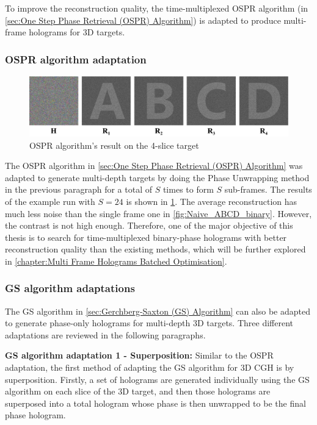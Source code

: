 To improve the reconstruction quality, the time-multiplexed OSPR algorithm (in \cref{sec:One Step Phase Retrieval (OSPR) Algorithm}) is adapted to produce multi-frame holograms for 3D targets.


\subsubsection{OSPR algorithm adaptation}
\begin{figure}[H]
	\centering
	\includegraphics[width=1.0\textwidth]{ABCD/OSPR_ABCD.pdf}
	\caption{OSPR algorithm's result on the 4-slice target}
	\label{fig:OSPR_ABCD}
\end{figure}

The OSPR algorithm in \cref{sec:One Step Phase Retrieval (OSPR) Algorithm} was adapted to generate multi-depth targets by doing the Phase Unwrapping method in the previous paragraph for a total of $S$ times to form $S$ sub-frames. The results of the example run with $S=24$ is shown in \cref{fig:OSPR_ABCD}. The average reconstruction has much less noise than the single frame one in \cref{fig:Naive_ABCD_binary}. However, the contrast is not high enough. Therefore, one of the major objective of this thesis is to search for time-multiplexed binary-phase holograms with better reconstruction quality than the existing methods, which will be further explored in \cref{chapter:Multi Frame Holograms Batched Optimisation}.

\subsubsection{GS algorithm adaptations} \label{sec:GS algorithm adaptation}
The GS algorithm in \cref{sec:Gerchberg-Saxton (GS) Algorithm} can also be adapted to generate phase-only holograms for multi-depth 3D targets. Three different adaptations are reviewed in the following paragraphs.

\textbf{GS algorithm adaptation 1 - Superposition: }
Similar to the OSPR adaptation, the first method of adapting the GS algorithm for 3D CGH is by superposition. Firstly, a set of holograms are generated individually using the GS algorithm on each slice of the 3D target, and then those holograms are superposed into a total hologram whose phase is then unwrapped to be the final phase hologram.

